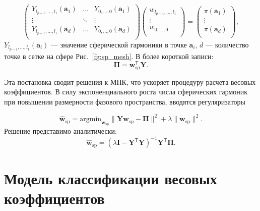 \documentclass[article,14pt,subf,href,colorlinks=true
]{disser}
\begin{document}
\begin{equation}
\begin{pmatrix} 
	{Y}_{l_{p-1},...,l_1}({\mathbf{a}}_1) & \ldots & {Y}_{0,...,0}({\mathbf{a}}_1)\\
	\vdots& \ddots & \vdots\\
	{Y}_{l_{p-1},...,l_1}({\mathbf{a}}_d) & \ldots & {Y}_{0,...,0}({\mathbf{a}}_d)\\
\end{pmatrix}
\begin{pmatrix} 
	w_{l_{p-1},...,l_1}\\
	\vdots\\
	w_{0,...,0}\\
\end{pmatrix}
=
\begin{pmatrix} 
	\pi(\mathbf{a}_1)\\
	\vdots\\
	\pi(\mathbf{a}_d)\\
\end{pmatrix},
\label{eq:sp_app_matrix}
\end{equation}
 $Y_{l_{p-1},...,l_1}({\mathbf{a}}_i)$ --- значение сферической гармоники в точке ${\mathbf{a}}_i$, $d$ --- количество точке в сетке на сфере Рис.~\ref{fg:sp_mesh}.
В более короткой записи:
\begin{equation}
\mathbf{\Pi} = \mathbf{w}_{\text{sp}}^{\mathsf{T}}\mathbf{{Y}}.
\label{eq:sp_app_matrix_short}
\end{equation}

Эта постановка сводит решения к МНК, что ускоряет процедуру расчета весовых коэффициентов.
В силу экспоненциального роста числа сферических гармоник при повышении размерности фазового пространства, вводятся регуляризаторы

\begin{equation}
    \mathbf{\hat{w}}_{\text{sp}} = \text{argmin}_{\mathbf{w}_{\text{sp}}}
    \|\mathbf{{Y}}\mathbf{w}_{\text{sp}} - \mathbf{\Pi}\|^2 + \lambda\|\mathbf{w}_{\text{sp}}\|^2.
\label{eq:arg_l2}
\end{equation}
Решение представимо аналитически:
\begin{equation}
    \mathbf{\hat{w}}_{\text{sp}} = (\lambda \mathbf{I} - \mathbf{{Y}}^{\mathsf{T}}\mathbf{{Y}})^{-1}\mathbf{{Y}}^{\mathsf{T}}\mathbf{\Pi}.
\label{eq:arg_l2_solution}
\end{equation}


\section{Модель классификации весовых коэффициентов}
\end{document}
